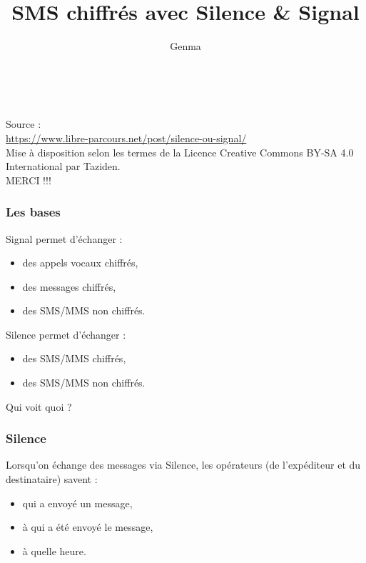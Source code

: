 \documentclass{beamer}
\title[SMS chiffrés avec Silence \& Signal]{SMS chiffrés avec Silence \& Signal}
\author{Genma}
\begin{document}
\begin{frame}
	\titlepage
	\vfill
	\begin{center}
		\\[2.5ex]
		{\tiny\CcNote{\CcLongnameByNcSa}}
		\vspace*{-2.5ex}
	\end{center}
\end{frame}
\begin{frame}
Source : 
\\ \url{https://www.libre-parcours.net/post/silence-ou-signal/}
\\ Mise à disposition selon les termes de la Licence Creative Commons BY-SA 4.0 International
par Taziden. 
\\ MERCI !!!
\end{frame}


\begin{frame}
\frametitle{Les bases}

\begin{block}{Signal permet d’échanger :}
\begin{itemize}
\item des appels vocaux chiffrés,
\item des messages chiffrés,
\item des SMS/MMS non chiffrés.
\end{itemize}
\end{block}

\begin{block}{Silence permet d’échanger :}
\begin{itemize}
\item des SMS/MMS chiffrés,
\item des SMS/MMS non chiffrés.
\end{itemize}
\end{block}
\end{frame}

\begin{frame}
\Huge{\centerline{Qui voit quoi ?}}
\end{frame}
\begin{frame}
\frametitle{Silence}
\begin{block}{Lorsqu’on échange des messages via Silence, les opérateurs (de l’expéditeur et du destinataire) savent :}
\begin{itemize}
\item qui a envoyé un message,
\item à qui a été envoyé le message,
\item à quelle heure.
\end{itemize}
\end{block}
\end{frame}
\end{document}

